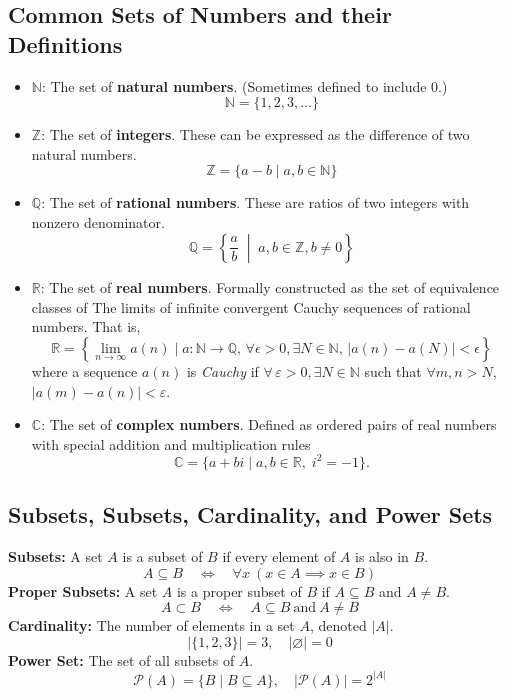 \documentclass[11pt]{article}
\begin{document}
\subsection{Common Sets of Numbers and their Definitions}
\begin{itemize}
    \item $\mathbb{N}$: The set of \textbf{natural numbers}. (Sometimes defined to include $0$.)
    \[
        \mathbb{N} = \{1, 2, 3, \dots\}
    \]
    \item $\mathbb{Z}$: The set of \textbf{integers}. These can be expressed as the difference of two natural numbers.
    \[
        \mathbb{Z} = \{a - b \mid a, b \in \mathbb{N}\}
    \]
    \item $\mathbb{Q}$: The set of \textbf{rational numbers}. These are ratios of two integers with nonzero denominator.
    \[
        \mathbb{Q} = \left\{\frac{a}{b} \;\middle|\; a, b \in \mathbb{Z}, b \neq 0 \right\}
    \]
    \item $\mathbb{R}$: The set of \textbf{real numbers}. Formally constructed as the set of equivalence classes of The limits of infinite convergent Cauchy sequences of rational numbers. That is,
    \[
        \mathbb{R} = \left\{ \lim_{n \to \infty} a(n) \mid a: \mathbb{N}\to\mathbb{Q},\,\forall \epsilon > 0, \exists N \in \mathbb{N},\, \left|a(n) - a(N)\right| < \epsilon\right\}
    \]
    where a sequence $a(n)$ is \emph{Cauchy} if $\forall \, \varepsilon > 0, \exists N \in \mathbb{N}$ such that $\forall m,n > N$, $|a(m) - a(n)| < \varepsilon$.
    \item $\mathbb{C}$: The set of \textbf{complex numbers}. Defined as ordered pairs of real numbers with special addition and multiplication rules
    \[
        \mathbb{C} = \{a + bi \mid a, b \in \mathbb{R}, \; i^2 = -1\}.
    \]
\end{itemize}
\subsection{Subsets, Subsets, Cardinality, and Power Sets}
\textbf{Subsets:} A set $A$ is a subset of $B$ if every element of $A$ is also in $B$.
\[
    A \subseteq B \quad \iff \quad \forall x \ (x \in A \implies x \in B)
\]
\textbf{Proper Subsets:} A set $A$ is a proper subset of $B$ if $A\subseteq B$ and $A \neq B$.
\[
    A \subset B \quad \iff \quad A \subseteq B \ \text{and} \ A \neq B
\]
\textbf{Cardinality:} The number of elements in a set $A$, denoted $|A|$.
\[
    | \{1,2,3\} | = 3, \quad | \varnothing | = 0
\]
\textbf{Power Set:} The set of all subsets of $A$.
\[
    \mathcal{P}(A) = \{ B \mid B \subseteq A \}, \quad |\mathcal{P}(A)| = 2^{|A|}
\]
\end{document}
